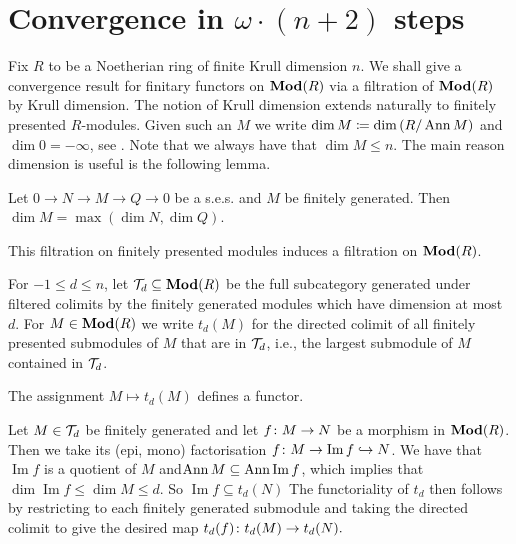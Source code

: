 \documentclass[runningheads]{llncs}
\begin{document}
\section{Convergence in $\omega\cdot(n+2)$ steps}
\label{sec:omega3}
Fix $R$ to be a Noetherian ring of finite Krull dimension $n$. We shall give a convergence result for finitary functors on $\operatorname{\mathbf{Mod}}(R)$ via a filtration of $\operatorname{\mathbf{Mod}}(R)$ by Krull dimension.
The notion of Krull dimension extends naturally to finitely presented $R$-modules. Given such an $M$ we write $\dim M \coloneqq  \dim \left(R/\operatorname{Ann} M \right)$ and $\dim 0 =-\infty$, see \cite[Chapter 9]{eisenbud95}.  Note that we always have that $\dim M \leq n$.  The main reason dimension is useful is the following lemma.
\begin{lemma}\label{lem:extensionsmax}\cite[Lemma 10.62.7]{stacks-project}
Let $0 \to N \to M \to Q \to 0$ be a s.e.s. and $M$  be finitely generated. Then $\dim M  =  \max \left( \dim N,\dim Q \right)$.
\end{lemma}
This filtration on finitely presented modules induces a filtration on $\operatorname{\mathbf{Mod}}(R)$.
\begin{definition}
For $-1 \leq d \leq n$, let $\mathcal T_d \subseteq \operatorname{\mathbf{Mod}}(R)$ be the full subcategory generated under filtered colimits by  the finitely generated modules which have dimension at most $d$. For $M \in \operatorname{\mathbf{Mod}}(R)$ we write $t_d(M)$ for the directed colimit of all finitely presented submodules of $M$ that are in $\mathcal T_d$, i.e., the largest submodule of $M$ contained in $\mathcal T_d$.
\end{definition}
\begin{propositionE}
The assignment $M \mapsto t_d(M)$ defines a functor.
\end{propositionE}
\begin{proofE}
Let $M \in \mathcal T_d$ be finitely generated and let $f \colon M \to N$ be a morphism in $\operatorname{\mathbf{Mod}}(R)$.
Then we take its (epi, mono) factorisation  $f \colon M \to \operatorname{Im}f \hookrightarrow N$. 
We have that $\operatorname{Im}f$ is a quotient of $M$ and$ \operatorname{Ann} M \subseteq \operatorname{Ann} \operatorname{Im}f$, which implies that $\dim \operatorname{Im}f \leq \dim M \leq d$. So $\operatorname{Im}f \subseteq t_d(N)$
The functoriality of $t_d$ then follows by restricting to each finitely generated submodule and taking the directed colimit to give the desired map $t_d(f) \colon t_d(M) \to t_d(N).$
\end{proofE}
\end{document}
